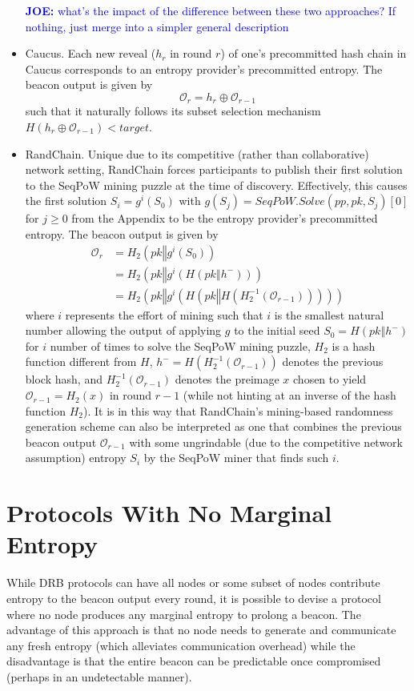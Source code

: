 \documentclass[letterpaper,twocolumn,10pt]{article}
\theoremstyle{definition}
\theoremstyle{remark}
\newcommand{\joenote}[1]{\textcolor{blue}{\textbf{JOE:} #1}}
\begin{document}
\begin{itemize}
\joenote{what's the impact of the difference between these two approaches? If nothing, just merge into a simpler general description}
\item Caucus. Each new reveal ($h_r$ in round $r$) of one's precommitted hash chain in Caucus corresponds to an entropy provider's precommitted entropy. The beacon output is given by
\[
\mathcal{O}_r = h_r \oplus \mathcal{O}_{r - 1}
\]
such that it naturally follows its subset selection mechanism $H(h_r \oplus \mathcal{O}_{r - 1}) < target$.
\item RandChain. Unique due to its competitive (rather than collaborative) network setting, RandChain forces participants to publish their first solution to the SeqPoW mining puzzle at the time of discovery. Effectively, this causes the first solution $S_i = g^i(S_0)$ with $g(S_j) = SeqPoW.Solve(pp, pk, S_j)[0]$ for $j \geq 0$ from the Appendix to be the entropy provider's precommitted entropy. The beacon output is given by
\begin{align*}
\mathcal{O}_r &= H_2(pk \mathbin\Vert g^i(S_0))\\
&= H_2(pk \mathbin\Vert g^i(H(pk \mathbin\Vert h^-)))\\
&= H_2(pk \mathbin\Vert g^i(H(pk \mathbin\Vert H(H_2^{-1}(\mathcal{O}_{r - 1})))))
\end{align*}
where $i$ represents the effort of mining such that $i$ is the smallest natural number allowing the output of applying $g$ to the initial seed $S_0 = H(pk \mathbin\Vert h^-)$ for $i$ number of times to solve the SeqPoW mining puzzle, $H_2$ is a hash function different from $H$, $h^- = H(H_2^{-1}(\mathcal{O}_{r - 1}))$ denotes the previous block hash, and $H_2^{-1}(\mathcal{O}_{r - 1})$ denotes the preimage $x$ chosen to yield $\mathcal{O}_{r - 1} = H_2(x)$ in round $r - 1$ (while not hinting at an inverse of the hash function $H_2$). It is in this way that RandChain's mining-based randomness generation scheme can also be interpreted as one that combines the previous beacon output $\mathcal{O}_{r - 1}$ with some ungrindable (due to the competitive network assumption) entropy $S_i$ by the SeqPoW miner that finds such $i$.
\end{itemize}

\section{Protocols With No Marginal Entropy}
\label{section:dvrf}
While DRB protocols can have all nodes or some subset of nodes contribute entropy to the beacon output every round, it is possible to devise a protocol where no node produces any marginal entropy to prolong a beacon. The advantage of this approach is that no node needs to generate and communicate any fresh entropy (which alleviates communication overhead) while the disadvantage is that the entire beacon can be predictable once compromised (perhaps in an undetectable manner).
\end{document}
